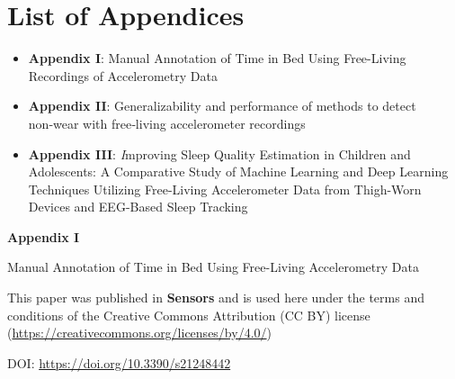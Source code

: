 \documentclass[
  9pt,
]{article}
\begin{document}
\newpage

\hypertarget{list-of-appendices}{%
\section{List of Appendices}\label{list-of-appendices}}

\begin{itemize}
\item
  \textbf{Appendix I}: Manual Annotation of Time in Bed Using
  Free-Living Recordings of Accelerometry Data
\item
  \textbf{Appendix II}: Generalizability and performance of methods to
  detect non‑wear with free‑living accelerometer recordings
\item
  \textbf{Appendix III}: \emph{I}mproving Sleep Quality Estimation in
  Children and Adolescents: A Comparative Study of Machine Learning and
  Deep Learning Techniques Utilizing Free-Living Accelerometer Data from
  Thigh-Worn Devices and EEG-Based Sleep Tracking
\end{itemize}

\newpage

\begin{center}

\textbf{\textsf{\Huge Appendix I}}


\vspace{1cm}

\textsf{\Huge Manual Annotation of Time in Bed Using Free-Living Accelerometry Data}

\vspace{5cm}

This paper was published in \textbf{Sensors} and is used here under the terms and conditions of the Creative Commons Attribution (CC BY) license (\href{https://creativecommons.org/licenses/by/4.0/}{https://creativecommons.org/licenses/by/4.0/})

\vspace{1cm}

DOI: \href{https://doi.org/10.3390/s21248442}{https://doi.org/10.3390/s21248442}

\end{center}


\end{document}
